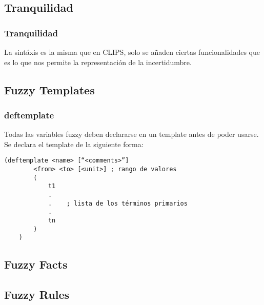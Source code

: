 \documentclass{beamer}
\begin{document}
\subsection{Tranquilidad}
\begin{frame}
\frametitle{Tranquilidad}
La sintáxis es la misma que en CLIPS, solo se añaden ciertas funcionalidades que es lo que nos permite la representación de la incertidumbre.
\end{frame}

\subsection{Fuzzy Templates}

\begin{frame}[fragile]
	\frametitle{deftemplate}
	Todas las variables fuzzy deben declararse en un template antes de poder usarse. Se declara el template de la siguiente forma:
	\begin{Verbatim}[tabsize=8,fontsize=\footnotesize]
	(deftemplate <name> [“<comments>”]
	    <from> <to> [<unit>] ; rango de valores
	    (
	        t1
	        .
	        .    ; lista de los términos primarios
	        .    
         	tn
	    )
	)
	\end{Verbatim}

\end{frame}
\subsection{Fuzzy Facts}

\subsection{Fuzzy Rules}



\end{document}
